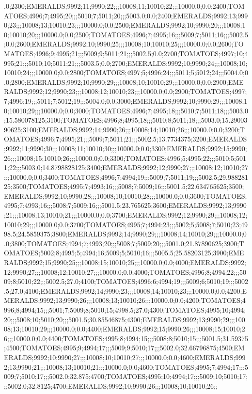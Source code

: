 .0;2300;EMERALDS;9992;11;9990;22;;;10008;11;10010;22;;;10000.0;0.0;2400;TOMATOES;4996;7;4995;20;;;5010;7;5011;20;;;5003.0;0.0;2400;EMERALDS;9992;13;9990;23;;;10008;13;10010;23;;;10000.0;0.0;2500;EMERALDS;9992;10;9990;20;;;10008;10;10010;20;;;10000.0;0.0;2500;TOMATOES;4996;7;4995;16;;;5009;7;5011;16;;;5002.5;0.0;2600;EMERALDS;9992;10;9990;25;;;10008;10;10010;25;;;10000.0;0.0;2600;TOMATOES;4996;9;4995;21;;;5009;9;5011;21;;;5002.5;0.0;2700;TOMATOES;4997;10;4995;21;;;5010;10;5011;21;;;5003.5;0.0;2700;EMERALDS;9992;10;9990;24;;;10008;10;10010;24;;;10000.0;0.0;2800;TOMATOES;4997;5;4996;24;;;5011;5;5012;24;;;5004.0;0.0;2800;EMERALDS;9992;10;9990;29;;;10008;10;10010;29;;;10000.0;0.0;2900;EMERALDS;9992;12;9990;23;;;10008;12;10010;23;;;10000.0;0.0;2900;TOMATOES;4997;7;4996;19;;;5011;7;5012;19;;;5004.0;0.0;3000;EMERALDS;9992;10;9990;29;;;10008;10;10010;29;;;10000.0;0.0;3000;TOMATOES;4996;7;4995;18;;;5010;7;5011;18;;;5003.0;15.580078125;3100;TOMATOES;4996;8;4995;18;;;5010;8;5011;18;;;5003.0;15.2900390625;3100;EMERALDS;9992;14;9990;26;;;10008;14;10010;26;;;10000.0;0.0;3200;TOMATOES;4996;7;4995;21;;;5009;7;5011;21;;;5002.5;13.7734375;3200;EMERALDS;9992;11;9990;30;;;10008;11;10010;30;;;10000.0;0.0;3300;EMERALDS;9992;15;9990;26;;;10008;15;10010;26;;;10000.0;0.0;3300;TOMATOES;4996;5;4995;22;;;5010;5;5011;22;;;5003.0;14.8798828125;3400;EMERALDS;9992;12;9990;27;;;10008;12;10010;27;;;10000.0;0.0;3400;TOMATOES;4996;7;4994;19;;;5009;7;5011;19;;;5002.5;29.98828125;3500;TOMATOES;4995;7;4993;16;;;5008;7;5009;16;;;5001.5;22.634765625;3500;EMERALDS;9992;10;9990;28;;;10008;10;10010;28;;;10000.0;0.0;3600;TOMATOES;4995;7;4993;16;;;5008;7;5009;16;;;5001.5;23.765625;3600;EMERALDS;9992;13;9990;21;;;10008;13;10010;21;;;10000.0;0.0;3700;EMERALDS;9992;12;9990;29;;;10008;12;10010;29;;;10000.0;0.0;3700;TOMATOES;4995;7;4994;23;;;5002;5;5008;7;5010;23;4998.5;24.5859375;3800;EMERALDS;9992;14;9990;29;;;10008;14;10010;29;;;10000.0;0.0;3800;TOMATOES;4994;7;4993;20;;;5008;7;5009;20;;;5001.0;21.87890625;3900;TOMATOES;5002;8;4995;5;4994;16;5009;5;5010;16;;;5005.5;25.58203125;3900;EMERALDS;9992;15;9990;25;;;10008;15;10010;25;;;10000.0;0.0;4000;EMERALDS;9992;12;9990;27;;;10008;12;10010;27;;;10000.0;0.0;4000;TOMATOES;4996;8;4994;22;;;5009;8;5010;22;;;5002.5;27.0;4100;TOMATOES;4996;6;4994;19;;;5009;6;5010;19;;;5002.5;27.0;4100;EMERALDS;9992;14;9990;23;;;10008;14;10010;23;;;10000.0;0.0;4200;EMERALDS;9992;13;9990;26;;;10008;13;10010;26;;;10000.0;0.0;4200;TOMATOES;4996;8;4994;15;;;5001;7;5009;8;5010;15;4998.5;27.0;4300;TOMATOES;4995;10;4994;20;;;5008;10;5010;20;;;5001.5;30.85546875;4300;EMERALDS;9992;13;9990;29;;;10008;13;10010;29;;;10000.0;0.0;4400;EMERALDS;9992;15;9990;26;;;10008;15;10010;26;;;10000.0;0.0;4400;TOMATOES;4995;8;4994;15;;;5008;8;5010;15;;;5001.5;31.59375;4500;TOMATOES;4995;9;4994;17;;;5009;9;5010;17;;;5002.0;32.66796875;4500;EMERALDS;9992;10;9990;27;;;10008;10;10010;27;;;10000.0;0.0;4600;EMERALDS;9992;13;9990;21;;;10008;13;10010;21;;;10000.0;0.0;4600;TOMATOES;4995;7;4994;17;;;5009;7;5010;17;;;5002.0;32.875;4700;TOMATOES;4995;10;4994;17;;;5009;10;5010;17;;;5002.0;32.8125;4700;EMERALDS;9992;10;9990;26;;;10008;10;10010;26;;